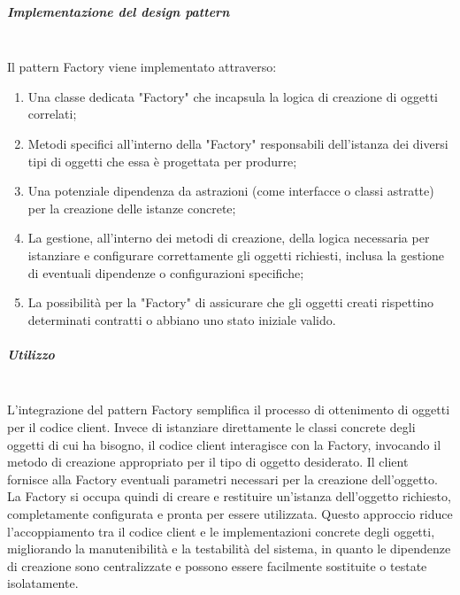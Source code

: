 \documentclass[10pt]{article}
\newcommand{\mysubparagraph}[1]{\subparagraph{#1}\mbox{}\\}
\begin{document}
    \mysubparagraph{Implementazione del design pattern}
    Il pattern Factory viene implementato attraverso:
    \begin{enumerate}
        \item Una classe dedicata "Factory" che incapsula la logica di creazione di oggetti correlati;
        \item Metodi specifici all'interno della "Factory" responsabili dell'istanza dei diversi tipi di oggetti che essa è progettata per produrre;
        \item Una potenziale dipendenza da astrazioni (come interfacce o classi astratte) per la creazione delle istanze concrete;
        \item La gestione, all'interno dei metodi di creazione, della logica necessaria per istanziare e configurare correttamente gli oggetti richiesti, inclusa la gestione di eventuali dipendenze o configurazioni specifiche;
        \item La possibilità per la "Factory" di assicurare che gli oggetti creati rispettino determinati contratti o abbiano uno stato iniziale valido.
    \end{enumerate}
    
    \mysubparagraph{Utilizzo}
    L'integrazione del pattern Factory semplifica il processo di ottenimento di oggetti per il codice client. Invece di istanziare direttamente le classi concrete degli oggetti di cui ha bisogno, il codice client interagisce con la Factory, invocando il metodo di creazione appropriato per il tipo di oggetto desiderato. Il client fornisce alla Factory eventuali parametri necessari per la creazione dell'oggetto. La Factory si occupa quindi di creare e restituire un'istanza dell'oggetto richiesto, completamente configurata e pronta per essere utilizzata. Questo approccio riduce l'accoppiamento tra il codice client e le implementazioni concrete degli oggetti, migliorando la manutenibilità e la testabilità del sistema, in quanto le dipendenze di creazione sono centralizzate e possono essere facilmente sostituite o testate isolatamente.
\end{document}

